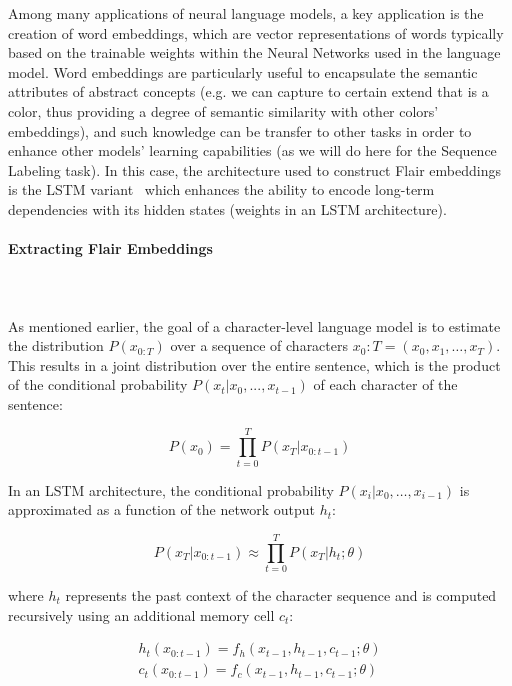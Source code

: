 Among many applications of neural language models, a key application is the creation of word embeddings, which are vector representations of words typically based on the trainable weights within the Neural Networks used in the language model. Word embeddings are 
particularly useful to encapsulate the semantic attributes of abstract concepts (e.g. we can capture to certain extend that  is a color, thus providing a degree of semantic similarity with other colors' embeddings), and such knowledge can be transfer to other tasks in order to enhance other models' learning capabilities (as we will do here for the Sequence Labeling task). In this case, the architecture used to construct Flair embeddings is the LSTM variant~\cite{seqlab:HochreiterS97,seqlab:Graves13,seqlab:ZarembaSV14} which enhances the ability to encode long-term dependencies with its hidden states (weights in an LSTM 
architecture).

\paragraph{Extracting Flair Embeddings}
\label{cap2:theoFrame/infExtr/sequenceLabeling/contextualEmbeddings/flairEmbeddings}
\mbox{}\\
\mbox{}\\
As mentioned earlier, the goal of a character-level language model is to estimate the 
distribution $P(x_{0:T})$ over a sequence of characters $x_0:T =(x_0, x_1,\ldots, x_T)$. This 
results in a joint distribution over the entire sentence, which is the product of the 
conditional probability $P(x_t|x_0,..., x_{t-1})$ of each character of the sentence:

\begin{equation} \label{eq:flairProb}
    P(x_0) = \prod_{t=0}^{T} P(x_T|x_{0:t-1})
\end{equation}

In an LSTM architecture, the conditional probability $P(x_i|x_0,\ldots,x_{i-1})$ is approximated 
as a function of the network output $h_t$:

\[
    P(x_T|x_{0:t-1}) \approx \prod_{t=0}^{T} P(x_T|h_t;\theta)    
\]

\noindent where $h_t$ represents the past context of the character sequence and is computed recursively 
using an additional memory cell $c_t$:

\begin{align*}
    h_t(x_{0:t-1})=f_h(x_{t-1},h_{t-1},c_{t-1};\theta) \\
    c_t(x_{0:t-1})=f_c(x_{t-1},h_{t-1},c_{t-1};\theta)    
\end{align*}


